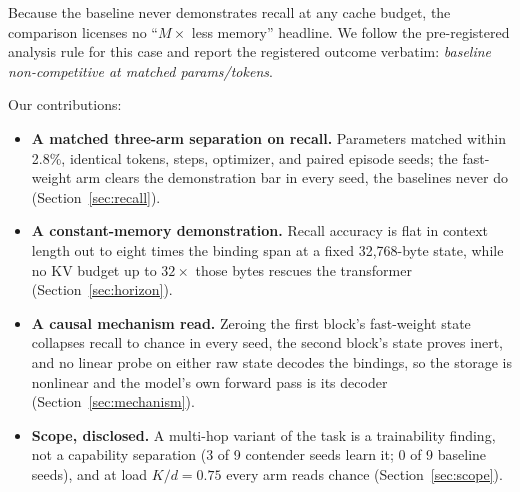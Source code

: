 Because the baseline never demonstrates recall at any cache budget, the
comparison licenses no ``$M\times$ less memory'' headline. We follow the
pre-registered analysis rule for this case and report the registered
outcome verbatim: \emph{baseline non-competitive at matched
params/tokens}. %

Our contributions:
\begin{itemize}
\item \textbf{A matched three-arm separation on recall.} Parameters matched
  within 2.8\%, %
  identical tokens, steps, optimizer, and paired episode seeds; the
  fast-weight arm clears the demonstration bar in every seed, the baselines
  never do (Section~\ref{sec:recall}).
\item \textbf{A constant-memory demonstration.} Recall accuracy is flat in
  context length out to eight times the binding
  span %
  at a fixed 32{,}768-byte
  state, %
  while no KV budget up to $32\times$ those bytes
  rescues the transformer %
  (Section~\ref{sec:horizon}).
\item \textbf{A causal mechanism read.} Zeroing the first block's
  fast-weight state collapses recall to chance in every seed, the second
  block's state proves inert, and no linear probe on either raw state
  decodes the bindings, so the storage is nonlinear and the model's own
  forward pass is its decoder (Section~\ref{sec:mechanism}).
\item \textbf{Scope, disclosed.} A multi-hop variant of the task is a
  trainability finding, not a capability separation (3 of 9 contender
  seeds learn it; 0 of 9 baseline seeds), %
  and at load $K/d = 0.75$ every arm reads chance %
  (Section~\ref{sec:scope}).
\end{itemize}
